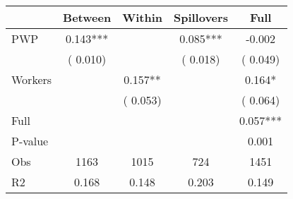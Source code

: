 
\begin{tabular}{l*{4}{c}}\hline&\multicolumn{1}{c}{Between}&\multicolumn{1}{c}{Within}&\multicolumn{1}{c}{Spillovers}&\multicolumn{1}{c}{Full}\\ \hline
 PWP           &              0.143***      &                                               &        0.085*** &        -0.002                            \\ 
                               &        (       0.010)           &                                       &       (       0.018)     &      (       0.049)                                           \\ 
 Workers       &                                               &        0.157**    &                                &             0.164*                            \\ 
                               &                                               & (       0.053)                  &                                        &      (       0.064)                                           \\ 
\hline                                                                                                                                                                                                                                            
 Full                  &                                               &                                               &                                        &             0.057***                                     \\ 
 P-value               &                                               &                                               &                                        &             0.001                                           \\ 
 Obs                   &               1163               &       1015                       &       724                &              1451                                               \\ 
 R2                    &                      0.168              &              0.148                      &              0.203               &                     0.149                                              \\ 
\hline \end{tabular}                                                                                                                                                                                                              